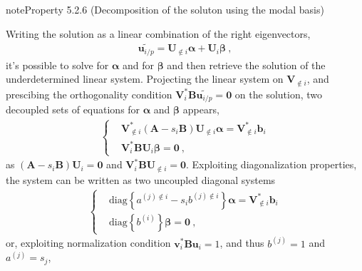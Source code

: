 \documentclass[letterpaper,10pt,english]{jupyterBook}
\begin{document}
\begin{sphinxadmonition}{note}{Property 5.2.6 (Decomposition of the soluton using the modal basis)}



\sphinxAtStartPar
Writing the solution as a linear combination of the right eigenvectors,
\begin{equation*}
\begin{split}\widetilde{\mathbf{u}_{i/p}} = \mathbf{U}_{\notin i} \boldsymbol\alpha + \mathbf{U}_i \boldsymbol\beta \ ,\end{split}
\end{equation*}
\sphinxAtStartPar
it’s possible to solve for \(\boldsymbol\alpha\) and for \(\boldsymbol\beta\) and then retrieve the solution of the underdetermined linear system. Projecting the linear system on \(\mathbf{V}_{\notin i}\), and prescibing the orthogonality condition \(\mathbf{V}_i^* \mathbf{B} \widetilde{\mathbf{u}_{i/p}} = \mathbf{0}\) on the solution, two decoupled sets of equations for \(\boldsymbol\alpha\) and \(\boldsymbol\beta\) appears,
\begin{equation*}
\begin{split}\left\{ \begin{aligned}
 &  \mathbf{V}_{\notin i}^* \left( \mathbf{A} - s_i \mathbf{B} \right) \mathbf{U}_{\notin i} \boldsymbol\alpha = \mathbf{V}_{\notin i}^* \mathbf{b}_i \\
 & \mathbf{V}_i^* \mathbf{B} \mathbf{U}_i \boldsymbol{\beta} = \mathbf{0} \ ,
\end{aligned}\right.\end{split}
\end{equation*}
\sphinxAtStartPar
as \(\left( \mathbf{A} - s_i \mathbf{B} \right) \mathbf{U}_i = \mathbf{0}\) and \(\mathbf{V}_{i}^* \mathbf{B} \mathbf{U}_{\notin i} = \mathbf{0}\). Exploiting diagonalization properties, the system can be written as two uncoupled diagonal systems
\begin{equation*}
\begin{split}\left\{ \begin{aligned}
 &  \text{diag} \left\{ a^{(j) \notin i} - s_i b^{(j) \notin i} \right\} \boldsymbol\alpha = \mathbf{V}_{\notin i}^* \mathbf{b}_i \\
 &  \text{diag} \left\{ b^{(i)} \right\} \boldsymbol{\beta} = \mathbf{0} \ ,
\end{aligned}\right.\end{split}
\end{equation*}
\sphinxAtStartPar
or, exploiting normalization condition \(\mathbf{v}_i^* \mathbf{B} \mathbf{u}_i = 1\), and thus \(b^{(j)} = 1\) and \(a^{(j)} = s_j\),

\end{sphinxadmonition}
\end{document}
